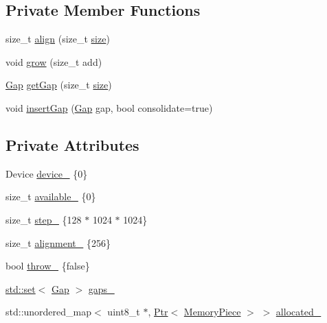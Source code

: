 \subsection*{Private Member Functions}
\begin{DoxyCompactItemize}
\item 
size\+\_\+t \hyperlink{classmarian_1_1Allocator_ad35f239037c6bdd96370d04a54812a9b}{align} (size\+\_\+t \hyperlink{classmarian_1_1Allocator_a93bed619eb9ee33bea60953aae2451bb}{size})
\item 
void \hyperlink{classmarian_1_1Allocator_a019a57dc40f12b739fa2cc1a7fbbe9f2}{grow} (size\+\_\+t add)
\item 
\hyperlink{classmarian_1_1Gap}{Gap} \hyperlink{classmarian_1_1Allocator_af67c8e9dd2c1cee26a1c064bf2c1f352}{get\+Gap} (size\+\_\+t \hyperlink{classmarian_1_1Allocator_a93bed619eb9ee33bea60953aae2451bb}{size})
\item 
void \hyperlink{classmarian_1_1Allocator_a29dec83519003c94b5ef7520a8235f5b}{insert\+Gap} (\hyperlink{classmarian_1_1Gap}{Gap} gap, bool consolidate=true)
\end{DoxyCompactItemize}
\subsection*{Private Attributes}
\begin{DoxyCompactItemize}
\item 
Device \hyperlink{classmarian_1_1Allocator_af67d68259655a2bb58926f57a18107d0}{device\+\_\+} \{0\}
\item 
size\+\_\+t \hyperlink{classmarian_1_1Allocator_afd4c68c5640f478ce3d370c6cf5b5078}{available\+\_\+} \{0\}
\item 
size\+\_\+t \hyperlink{classmarian_1_1Allocator_a1d2edd412f03ab7d3b72634498424354}{step\+\_\+} \{128 $\ast$ 1024 $\ast$ 1024\}
\item 
size\+\_\+t \hyperlink{classmarian_1_1Allocator_a7a1d6e931c3c27aa9acd1a6c6e4536d4}{alignment\+\_\+} \{256\}
\item 
bool \hyperlink{classmarian_1_1Allocator_afcc8754622b6574b234dc7dba46ccea7}{throw\+\_\+} \{false\}
\item 
\hyperlink{marian_2src_2tests_2CMakeLists_8txt_a59d4487ba23386d5b73310f034357598}{std\+::set}$<$ \hyperlink{classmarian_1_1Gap}{Gap} $>$ \hyperlink{classmarian_1_1Allocator_a460784b3875b3cfa400c7737a6f6a1f0}{gaps\+\_\+}
\item 
std\+::unordered\+\_\+map$<$ uint8\+\_\+t $\ast$, \hyperlink{namespacemarian_ad1a373be43a00ef9ce35666145137b08}{Ptr}$<$ \hyperlink{classmarian_1_1MemoryPiece}{Memory\+Piece} $>$ $>$ \hyperlink{classmarian_1_1Allocator_a26ed19566ebce33bdf4e6806566e7498}{allocated\+\_\+}
\end{DoxyCompactItemize}


